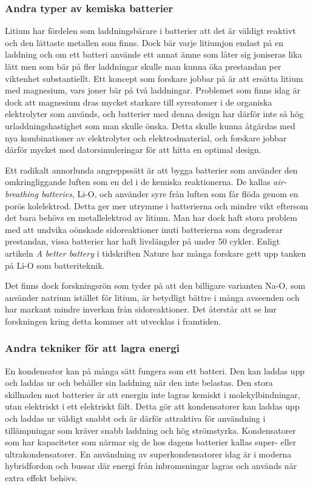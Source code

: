 \documentclass[a4paper,12pt]{article}
\begin{document}
\subsubsection{Andra typer av kemiska batterier}
Litium har fördelen som laddningsbärare i batterier att det är väldigt reaktivt och den lättaste metallen som finns. Dock bär varje litiumjon endast på en laddning och om ett batteri använde ett annat ämne som låter sig joniseras lika lätt men som bär på fler laddningar skulle man kunna öka prestandan per viktenhet substantiellt. Ett koncept som forskare jobbar på är att ersätta litium med magnesium, vars joner bär på två laddningar. Problemet som finns idag är dock att magnesium dras mycket starkare till syreatomer i de organiska elektrolyter som används, och batterier med denna design har därför inte så hög urladdningshastighet som man skulle önska. Detta skulle kunna åtgärdas med nya kombinationer av elektrolyter och elektrodmaterial, och forskare jobbar därför mycket med datorsimuleringar för att hitta en optimal design. \cite{better-battery}

Ett radikalt annorlunda angreppssätt är att bygga batterier som använder den omkringliggande luften som en del i de kemiska reaktionerna. De kallas \emph{air-breathing batteries}, Li-O, och använder syre från luften som får flöda genom en porös kolelektrod. Detta ger mer utrymme i batterierna och mindre vikt eftersom det bara behövs en metallelektrod av litium. Man har dock haft stora problem med att undvika oönskade sidoreaktioner inuti batterierna som degraderar prestandan, vissa batterier har haft livslängder på under 50 cykler. Enligt artikeln \emph{A better battery} i tidskriften Nature har många forskare gett upp tanken på Li-O som batteriteknik. \cite{better-battery}

Det finns dock forskningsrön som tyder på att den billigare varianten Na-O, som använder natrium istället för litium, är betydligt bättre i många avseenden och har markant mindre inverkan från sidoreaktioner. Det återstår att se hur forskningen kring detta kommer att utvecklas i framtiden. \cite{better-battery}

\subsubsection{Andra tekniker för att lagra energi}
En kondensator kan på många sätt fungera som ett batteri. Den kan laddas upp och laddas ur och behåller sin laddning när den inte belastas. Den stora skillnaden mot batterier är att energin inte lagras kemiskt i molekylbindningar, utan elektriskt i ett elektriskt fält. Detta gör att kondensatorer kan laddas upp och laddas ur väldigt snabbt och är därför attraktiva för användning i tillämpningar som kräver snabb laddning och hög strömstyrka. Kondensatorer som har kapaciteter som närmar sig de hos dagens batterier kallas super- eller ultrakondensatorer. En användning av superkondensatorer idag är i moderna hybridfordon och bussar där energi från inbromsningar lagras och används när extra effekt behövs.\cite{capacitors}
\end{document}
